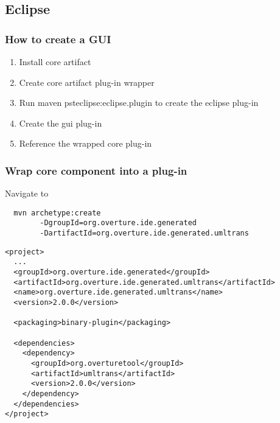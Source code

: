 \subsection{Eclipse}


\frame
{
  \frametitle{How to create a GUI}
\begin{enumerate}
	\item Install core artifact
	\item Create core artifact plug-in wrapper
	\item Run maven psteclipse:eclipse.plugin to create the eclipse plug-in
	\item Create the gui plug-in
	\item Reference the wrapped core plug-in
\end{enumerate}


}

\begin{frame}[fragile]
  \frametitle{Wrap core component into a plug-in}

Navigate to 
  \begin{lstlisting}
  mvn archetype:create 
		-DgroupId=org.overture.ide.generated
		-DartifactId=org.overture.ide.generated.umltrans 
  \end{lstlisting}




\begin{lstlisting}
<project>
  ...
  <groupId>org.overture.ide.generated</groupId>
  <artifactId>org.overture.ide.generated.umltrans</artifactId>
  <name>org.overture.ide.generated.umltrans</name>
  <version>2.0.0</version>

  <packaging>binary-plugin</packaging>

  <dependencies>
    <dependency>
      <groupId>org.overturetool</groupId>
      <artifactId>umltrans</artifactId>
      <version>2.0.0</version>
    </dependency>
  </dependencies>
</project>
\end{lstlisting}
\end{frame}



